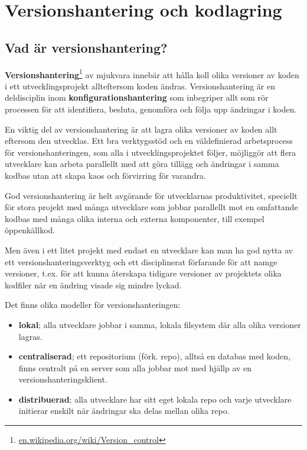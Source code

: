 

\chapter{Versionshantering och kodlagring}

\section{Vad är versionshantering?}

\textbf{Versionshantering}\footnote{\href{https://en.wikipedia.org/wiki/Version_control}{en.wikipedia.org/wiki/Version\_control}}  av mjukvara innebär att hålla koll olika versioner av koden i ett utvecklingsprojekt allteftersom koden ändras. Versionshantering är en deldisciplin inom \textbf{konfigurationshantering}  som inbegriper allt som rör processen för att identifiera, besluta, genomföra och följa upp ändringar i koden.

En viktig del av versionshantering är att lagra olika versioner av koden allt eftersom den utvecklas. Ett bra verktygsstöd och en väldefinierad arbetsprocess för versionshanteringen, som alla i utvecklingsprojektet följer, möjliggör att flera utvecklare kan arbeta parallellt med att göra tillägg och ändringar i samma kodbas utan att skapa kaos och förvirring för varandra.

God versionshantering är helt avgörande för utvecklarnas produktivitet, speciellt för stora projekt med många utvecklare som jobbar parallellt mot en omfattande kodbas med många olika interna och externa komponenter, till exempel öppenkällkod. 

Men även i ett litet projekt med endast en utvecklare kan man ha god nytta av ett versionshanteringsverktyg och ett disciplinerat förfarande för att namge versioner, t.ex. för att kunna återskapa tidigare versioner av projektets olika kodfiler när en ändring visade sig mindre lyckad.   

Det finns olika modeller för versionshanteringen:
\begin{itemize}
\item \textbf{lokal}; alla utvecklare jobbar i samma, lokala filsystem där alla olika versioner lagras.
\item \textbf{centraliserad}; ett repositorium (förk. repo), alltså en databas med koden, finns centralt på en server som alla jobbar mot med hjällp av en versionshanteringsklient.
\item \textbf{distribuerad}; alla utvecklare har sitt eget lokala repo och varje utvecklare initierar enskilt när ändringar ska delas mellan olika repo.
\end{itemize}


